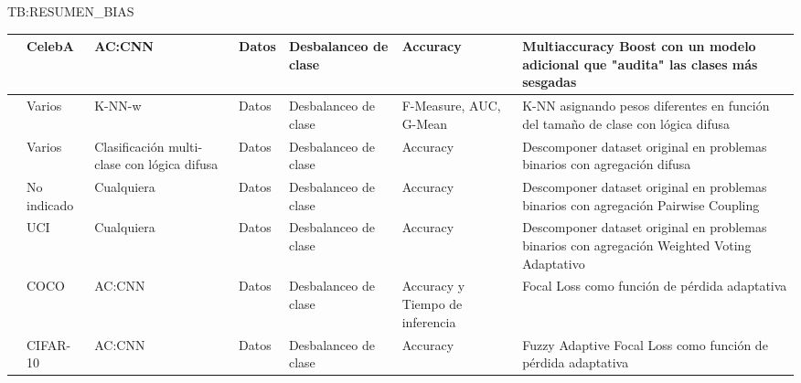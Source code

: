 \begin{table}[Resumen de papers género]{TB:RESUMEN_BIAS}
\begin{tabular}{cpppppp}
    \hline
    \cite{kim2019multiaccuracy} & CelebA & \acs{AC:CNN} & Datos & Desbalanceo de clase & Accuracy & Multiaccuracy Boost con un modelo adicional que "audita" las clases más sesgadas \\
    \hline
    \cite{patel2017classification} & Varios & K-NN-w & Datos & Desbalanceo de clase & F-Measure, AUC, G-Mean & K-NN asignando pesos diferentes en función del tamaño de clase con lógica difusa \\
    \hline
    \cite{fernandez2010solving} & Varios & Clasificación multi-clase con lógica difusa & Datos & Desbalanceo de clase & Accuracy & Descomponer dataset original en problemas binarios con agregación difusa \\
    \hline
    \cite{hastie1997classification} & No indicado & Cualquiera & Datos & Desbalanceo de clase & Accuracy & Descomponer dataset original en problemas binarios con agregación Pairwise Coupling \\
    \hline
    \cite{hullermeier2010combining} & UCI & Cualquiera & Datos & Desbalanceo de clase & Accuracy & Descomponer dataset original en problemas binarios con agregación Weighted Voting Adaptativo \\
    \hline
    \cite{lin2017focal} & COCO & \acs{AC:CNN} & Datos & Desbalanceo de clase & Accuracy y Tiempo de inferencia & Focal Loss como función de pérdida adaptativa \\
    \hline
    \cite{hong2021fuzzy} & CIFAR-10 & \acs{AC:CNN} & Datos & Desbalanceo de clase & Accuracy & Fuzzy Adaptive Focal Loss como función de pérdida adaptativa \\
    \hline
    \hline
  \end{tabular}
\end{table}